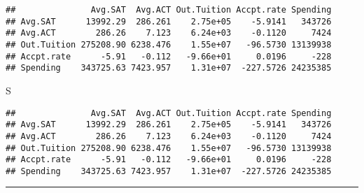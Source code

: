 \documentclass[]{article}
\newenvironment{Shaded}{\begin{snugshade}}{\end{snugshade}}
\newcommand{\KeywordTok}[1]{\textcolor[rgb]{0.13,0.29,0.53}{\textbf{#1}}}
\newcommand{\DataTypeTok}[1]{\textcolor[rgb]{0.13,0.29,0.53}{#1}}
\newcommand{\DecValTok}[1]{\textcolor[rgb]{0.00,0.00,0.81}{#1}}
\newcommand{\StringTok}[1]{\textcolor[rgb]{0.31,0.60,0.02}{#1}}
\newcommand{\CommentTok}[1]{\textcolor[rgb]{0.56,0.35,0.01}{\textit{#1}}}
\newcommand{\OtherTok}[1]{\textcolor[rgb]{0.56,0.35,0.01}{#1}}
\newcommand{\OperatorTok}[1]{\textcolor[rgb]{0.81,0.36,0.00}{\textbf{#1}}}
\newcommand{\NormalTok}[1]{#1}
\begin{document}
\begin{Shaded}
\end{Shaded}

\begin{verbatim}
##               Avg.SAT  Avg.ACT Out.Tuition Accpt.rate Spending
## Avg.SAT      13992.29  286.261    2.75e+05    -5.9141   343726
## Avg.ACT        286.26    7.123    6.24e+03    -0.1120     7424
## Out.Tuition 275208.90 6238.476    1.55e+07   -96.5730 13139938
## Accpt.rate      -5.91   -0.112   -9.66e+01     0.0196     -228
## Spending    343725.63 7423.957    1.31e+07  -227.5726 24235385
\end{verbatim}

\begin{Shaded}
\begin{Highlighting}[]
\NormalTok{S}
\end{Highlighting}
\end{Shaded}

\begin{verbatim}
##               Avg.SAT  Avg.ACT Out.Tuition Accpt.rate Spending
## Avg.SAT      13992.29  286.261    2.75e+05    -5.9141   343726
## Avg.ACT        286.26    7.123    6.24e+03    -0.1120     7424
## Out.Tuition 275208.90 6238.476    1.55e+07   -96.5730 13139938
## Accpt.rate      -5.91   -0.112   -9.66e+01     0.0196     -228
## Spending    343725.63 7423.957    1.31e+07  -227.5726 24235385
\end{verbatim}

\begin{center}\rule{0.5\linewidth}{\linethickness}\end{center}
\end{document}

